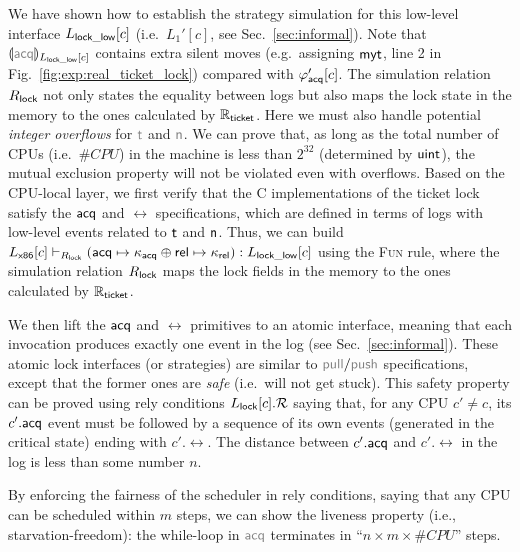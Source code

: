 We have shown how to establish the strategy simulation
for this low-level interface $L_{\mathsf{\textcolor{black}{lock\_low}}}[c]$ (i.e.\, $L_1'[c]$, see Sec.~\ref{sec:informal}).
Note that $\ssem{\commc{acq}}{L_\comm{lock\_low}[c]}$ contains extra silent moves (e.g.\, assigning $\mathsf{\textcolor{black}{myt}}$, line 2 in Fig.~\ref{fig:exp:real_ticket_lock}) compared with $\varphi_{\mathsf{\textcolor{black}{acq}}}'[c]$.
The simulation relation 
$R_{\mathsf{\textcolor{black}{lock}}}$ not only states the equality between logs but also maps the lock
state in the memory to the ones calculated by $\mathbb{R}_{\mathsf{\textcolor{black}{ticket}}}$.
Here we must also handle potential \emph{integer overflows} for $\commc{t}$ and $\commc{n}$.
We can prove that, as long as the total number of CPUs (i.e.\, $\#CPU$) in the machine is less than $2^{32}$ (determined by $\mathsf{\textcolor{black}{uint}}$), the mutual exclusion property will not be violated  even with overflows. 
Based on the CPU-local layer, we first verify that the C implementations of 
the ticket lock satisfy the $\mathsf{acq}$ and $\rel$ specifications,
which are defined in terms of logs with low-level events
related to $\mathsf{\textcolor{black}{t}}$ and $\mathsf{\textcolor{black}{n}}$.
Thus, we can build $L_\mathsf{x86}[c] \vdash_{R_{\mathsf{\textcolor{black}{lock}}}} (\mathsf{acq} \mapsto \kappa_{\mathsf{acq}}
\oplus \mathsf{rel} \mapsto \kappa_{\mathsf{rel}}) : L_{\mathsf{\textcolor{black}{lock\_low}}}[c]$
using the \textsc{Fun} rule,
where the simulation relation $R_{\mathsf{\textcolor{black}{lock}}}$ maps the lock
fields in the memory to the ones calculated by $\mathbb{R}_{\mathsf{\textcolor{black}{ticket}}}$.

We then lift the $\mathsf{acq}$ and $\rel$ primitives to an atomic interface, meaning that each
invocation produces exactly one event in the log (see Sec.~\ref{sec:informal}).
These atomic lock interfaces (or strategies) are similar to $\cpull/\cpush$ specifications,
except that the former ones are \emph{safe} (i.e.\, will not get stuck).
This safety property can be proved using rely conditions $L_{\mathsf{\textcolor{black}{lock}}}[c].\mathcal{R}$ saying that,
for any CPU $c'\neq c$, its $c'.\mathsf{acq}$ event must be followed by a sequence of its own events (generated in the critical state)
ending with $c'.\rel$. The distance between $c'.\mathsf{acq}$ and $c'.\rel$ in the log is less than some number $n$.

By enforcing the fairness of the scheduler in rely conditions, saying that any CPU can be scheduled
within $m$ steps, we can show the liveness property (i.e., starvation-freedom): the while-loop in $\commc{acq}$ terminates
in ``$n \times m \times \#CPU$'' steps.

